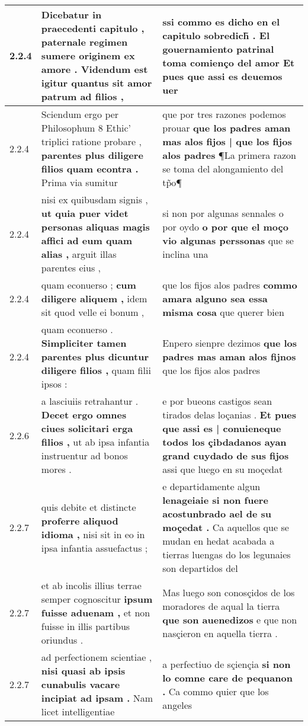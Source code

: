 \begin{tabular}{|p{1cm}|p{6.5cm}|p{6.5cm}|}
2.2.4 & Dicebatur in praecedenti capitulo , \textbf{ paternale regimen sumere originem ex amore . } Videndum est igitur quantus sit amor patrum ad filios , & ssi commo es dicho en el capitulo sobredich̃ . \textbf{ El gouernamiento patrinal toma comienço del amor Et } pues que assi es deuemos uer \\\hline
2.2.4 & Sciendum ergo per Philosophum 8 Ethic’ triplici ratione probare , \textbf{ parentes plus diligere filios quam econtra . } Prima via sumitur & que por tres razones podemos prouar \textbf{ que los padres aman mas alos fijos | que los fijos alos padres } ¶La primera razon se toma del alongamiento del tp̃o¶ \\\hline
2.2.4 & nisi ex quibusdam signis , \textbf{ ut quia puer videt personas aliquas magis affici ad eum quam alias , } arguit illas parentes eius , & si non por algunas sennales o por oydo \textbf{ o por que el moço vio algunas perssonas } que se inclina una \\\hline
2.2.4 & quam econuerso ; \textbf{ cum diligere aliquem , } idem sit quod velle ei bonum , & que los fijos alos padres \textbf{ commo amara alguno sea essa misma cosa } que querer bien \\\hline
2.2.4 & quam econuerso . \textbf{ Simpliciter tamen parentes plus dicuntur diligere filios , } quam filii ipsos : & Enpero sienpre dezimos \textbf{ que los padres mas aman alos fijnos } que los fijos alos padres \\\hline
2.2.6 & a lasciuiis retrahantur . \textbf{ Decet ergo omnes ciues solicitari erga filios , } ut ab ipsa infantia instruentur ad bonos mores . & e por bueons castigos sean tirados delas loçanias . \textbf{ Et pues que assi es | conuieneque todos los çibdadanos ayan grand cuydado de sus fijos } assi que luego en su moçedat \\\hline
2.2.7 & quis debite et distincte \textbf{ proferre aliquod idioma , } nisi sit in eo in ipsa infantia assuefactus ; & e departidamente algun \textbf{ lenageiaie si non fuere acostunbrado ael de su moçedat . } Ca aquellos que se mudan en hedat acabada a tierras luengas do los legunaies son departidos del \\\hline
2.2.7 & et ab incolis illius terrae semper cognoscitur \textbf{ ipsum fuisse aduenam , } et non fuisse in illis partibus oriundus . & Mas luego son conosçidos de los moradores de aqual la tierra \textbf{ que son auenedizos } e que non nasçieron en aquella tierra . \\\hline
2.2.7 & ad perfectionem scientiae , \textbf{ nisi quasi ab ipsis cunabulis vacare incipiat ad ipsam . } Nam licet intelligentiae & a perfectiuo de sçiençia \textbf{ si non lo comne care de pequanon . } Ca commo quier que los angeles \\\hline

\end{tabular}
